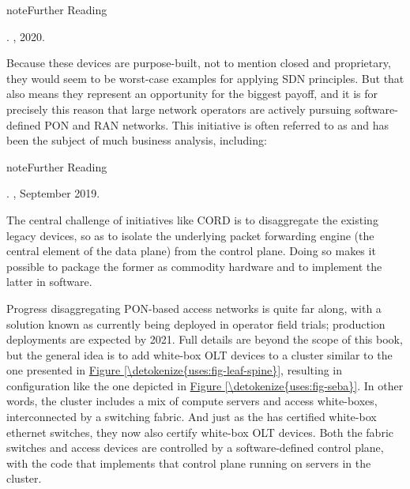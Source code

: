 \documentclass[letterpaper,11pt,english]{sphinxmanual}
\begin{document}
\label{\detokenize{uses:reading-access}}
\begin{sphinxadmonition}{note}{Further Reading}

. , 2020.
\end{sphinxadmonition}

Because these devices are purpose-built, not to mention closed and
proprietary, they would seem to be worst-case examples for applying
SDN principles. But that also means they represent an opportunity for
the biggest payoff, and it is for precisely this reason that large
network operators are actively pursuing software-defined PON and RAN
networks. This initiative is often referred to as  and has been the subject of
much business analysis, including:

\label{\detokenize{uses:reading-cord}}
\begin{sphinxadmonition}{note}{Further Reading}

. , September 2019.
\end{sphinxadmonition}

The central challenge of initiatives like CORD is to disaggregate the
existing legacy devices, so as to isolate the underlying packet
forwarding engine (the central element of the data plane) from the
control plane. Doing so makes it possible to package the former as
commodity hardware and to implement the latter in software.

Progress disaggregating PON-based access networks is quite far along,
with a solution known as 
currently being deployed in operator field trials; production
deployments are expected by 2021. Full details are beyond the scope of
this book, but the general idea is to add white-box OLT devices to a
cluster similar to the one presented in \hyperref[\detokenize{uses:fig-leaf-spine}]{Figure \ref{\detokenize{uses:fig-leaf-spine}}}, resulting in configuration like the one depicted in
\hyperref[\detokenize{uses:fig-seba}]{Figure \ref{\detokenize{uses:fig-seba}}}. In other words, the cluster includes a
mix of compute servers and access white-boxes, interconnected by a
switching fabric. And just as the  has
certified white-box ethernet switches, they now also certify white-box
OLT devices. Both the fabric switches and access devices are
controlled by a software-defined control plane, with the code that
implements that control plane running on servers in the cluster.
\end{document}
